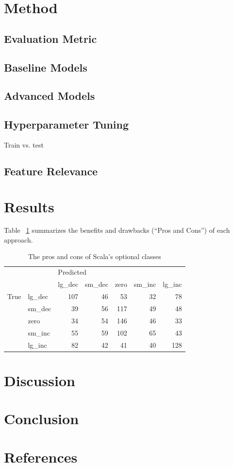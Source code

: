 \documentclass{article}
\begin{document}
	\section{Method}
	
	\subsection{Evaluation Metric}
	
	\subsection{Baseline Models}
	
	\subsection{Advanced Models}
	
	\subsection{Hyperparameter Tuning}
	
	Train vs. test
	
	\subsection{Feature Relevance}
	
	\section{Results}
	
	Table ~\ref{table:prosConsOptionalApproaches} summarizes
	the benefits and drawbacks (``Pros and Cons'') of each 
	approach.
	
	\begin{table}[h]
	\centering
	\caption{The pros and cons of Scala's optional classes}
	\label{table:prosConsOptionalApproaches}
	
	\begin{tabular}{llrrrrr}
		\toprule
		&        & \multicolumn{5}{l}{Predicted} \\
		&        &    lg\_dec & sm\_dec & zero & sm\_inc & lg\_inc \\
		\midrule
		True & lg\_dec &       107 &     46 &   53 &     32 &     78 \\
		& sm\_dec &        39 &     56 &  117 &     49 &     48 \\
		& zero &        34 &     54 &  146 &     46 &     33 \\
		& sm\_inc &        55 &     59 &  102 &     65 &     43 \\
		& lg\_inc &        82 &     42 &   41 &     40 &    128 \\
		\bottomrule
	\end{tabular}
	\end{table}%

	\section{Discussion}
	
	\section{Conclusion}
	
	\section{References}
	
	
\printbibliography
\end{document}
